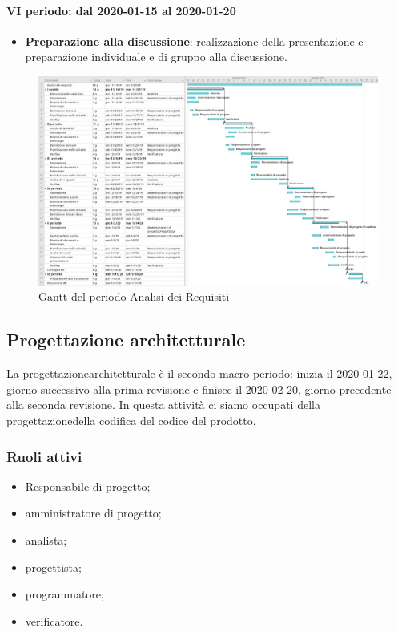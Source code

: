 \paragraph*{VI periodo: dal 2020-01-15 al 2020-01-20}
\begin{itemize}
	\item \textbf{Preparazione alla discussione}: realizzazione della presentazione e preparazione individuale e di gruppo alla discussione.
\end{itemize}

\begin{landscape}
	\begin{figure}[H] 	
		\includegraphics[width=\linewidth]{./gantt/Analisi_dei_Requisiti_datax2.png}	
		\caption{Gantt del periodo Analisi dei Requisiti}	
	\end{figure}
\end{landscape}

\subsection{Progettazione architetturale}
La progettazione\glosp architetturale è il secondo macro periodo: inizia il 2020-01-22, giorno successivo alla prima revisione e finisce il 2020-02-20, giorno precedente alla seconda revisione. In questa attività ci siamo occupati della progettazione\glosp della codifica del codice del prodotto\glo.

\subsubsection{Ruoli attivi}
\begin{itemize}
	\item Responsabile di progetto\glo;
	\item amministratore di progetto\glo;
	\item analista;
	\item progettista;
	\item programmatore;
	\item verificatore.
\end{itemize}

